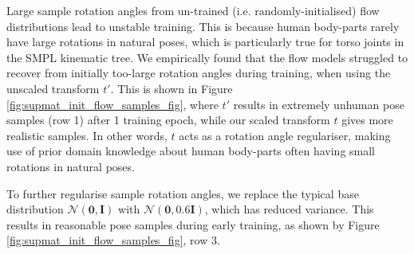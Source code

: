 Large sample rotation angles from un-trained (i.e. randomly-initialised) flow distributions lead to unstable training. This is because human body-parts rarely have large rotations in natural poses, which is particularly true for torso joints in the SMPL kinematic tree. We empirically found that the flow models struggled to recover from initially too-large rotation angles during training, when using the unscaled transform $t'$. This is shown in Figure \ref{fig:supmat_init_flow_samples_fig}, where $t'$ results in extremely unhuman pose samples (row 1) after 1 training epoch, while our scaled transform $t$ gives more realistic samples. In other words, $t$ acts as a rotation angle regulariser, making use of prior domain knowledge about human body-parts often having small rotations in natural poses.

To further regularise sample rotation angles, we replace the typical base distribution $\mathcal{N}(\mathbf{0}, \mathbf{I})$ with $\mathcal{N}(\mathbf{0}, 0.6\mathbf{I})$, which has reduced variance. This results in reasonable pose samples during early training, as shown by Figure \ref{fig:supmat_init_flow_samples_fig}, row 3.

